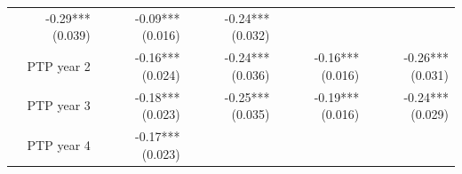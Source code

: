 \documentclass[]{article}
\begin{document}
\begin{longtable}[c]{@{}rrrrr@{}}
\begin{minipage}[t]{0.16\columnwidth}
-0.29*** (0.039)
\strut\end{minipage} &
\begin{minipage}[t]{0.18\columnwidth}\raggedleft\strut
-0.09*** (0.016)
\strut\end{minipage} &
\begin{minipage}[t]{0.15\columnwidth}\raggedleft\strut
-0.24*** (0.032)
\strut\end{minipage}\tabularnewline
\begin{minipage}[t]{0.17\columnwidth}\raggedleft\strut
PTP year 2
\strut\end{minipage} &
\begin{minipage}[t]{0.20\columnwidth}\raggedleft\strut
-0.16*** (0.024)
\strut\end{minipage} &
\begin{minipage}[t]{0.16\columnwidth}\raggedleft\strut
-0.24*** (0.036)
\strut\end{minipage} &
\begin{minipage}[t]{0.18\columnwidth}\raggedleft\strut
-0.16*** (0.016)
\strut\end{minipage} &
\begin{minipage}[t]{0.15\columnwidth}\raggedleft\strut
-0.26*** (0.031)
\strut\end{minipage}\tabularnewline
\begin{minipage}[t]{0.17\columnwidth}\raggedleft\strut
PTP year 3
\strut\end{minipage} &
\begin{minipage}[t]{0.20\columnwidth}\raggedleft\strut
-0.18*** (0.023)
\strut\end{minipage} &
\begin{minipage}[t]{0.16\columnwidth}\raggedleft\strut
-0.25*** (0.035)
\strut\end{minipage} &
\begin{minipage}[t]{0.18\columnwidth}\raggedleft\strut
-0.19*** (0.016)
\strut\end{minipage} &
\begin{minipage}[t]{0.15\columnwidth}\raggedleft\strut
-0.24*** (0.029)
\strut\end{minipage}\tabularnewline
\begin{minipage}[t]{0.17\columnwidth}\raggedleft\strut
PTP year 4
\strut\end{minipage} &
\begin{minipage}[t]{0.20\columnwidth}\raggedleft\strut
-0.17*** (0.023)
\strut\end{minipage} &
\begin{minipage}[t]{0.16\columnwidth}\raggedleft\strut

\end{minipage}
\end{longtable}
\end{document}
